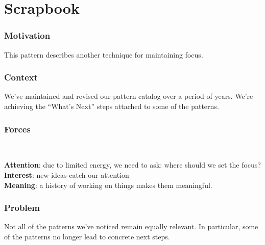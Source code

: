 \section{Scrapbook} \label{sec:Scrapbook}

\subsubsection*{Motivation} This pattern describes another technique for maintaining focus.  

\subsubsection*{Context} We've maintained and revised our pattern catalog over a period of years.  We're achieving
the ``What's Next'' steps attached to some of the patterns.

\subsubsection*{Forces}~
\parbox[t]{.85\textwidth}{
\textbf{Attention}: due to limited energy, we need to ask: where should we set the focus?\\
\textbf{Interest}: new ideas catch our attention\\
\textbf{Meaning}: a history of working on things makes them meaningful.
}

\subsubsection*{Problem} Not all of the patterns we've noticed remain equally relevant.  In particular, some of the patterns no longer lead to concrete next steps.

